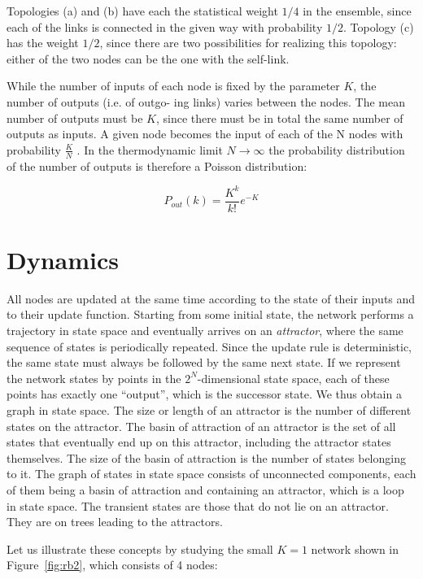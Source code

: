 Topologies (a) and (b) have each the statistical weight $1/4$ in
the ensemble, since each of the links is connected in the
given way with probability $1/2$. Topology (c) has the
weight $1/2$, since there are two possibilities for realizing
this topology: either of the two nodes can be the one
with the self-link.


While the number of inputs of each node is fixed by
the parameter $K$, the number of outputs (i.e. of outgo-
ing links) varies between the nodes. The mean number of
outputs must be $K$, since there must be in total the same
number of outputs as inputs. A given node becomes the
input of each of the N nodes with probability $\frac{K}{N}$ . In
the thermodynamic limit $N \to \infty$ the probability distribution of the number of outputs is therefore a Poisson
distribution:

$$
P_{out}(k) = \frac{K^k}{k!}e^{-K}
$$

\section{Dynamics}

All nodes are updated at the same time
according to the state of their inputs and to their update
function. Starting from some initial state, the network
performs a trajectory in state space and eventually arrives on an \emph{attractor}, where the same sequence of states
is periodically repeated. Since the update rule is deterministic, the same state must always be followed by the
same next state. If we represent the network states by
points in the $2^N$-dimensional state space, each of these
points has exactly one “output”, which is the successor
state. We thus obtain a graph in state space.
The size or length of an attractor is the number of
different states on the attractor. The basin of attraction
of an attractor is the set of all states that eventually
end up on this attractor, including the attractor states
themselves. The size of the basin of attraction is the
number of states belonging to it. The graph of states
in state space consists of unconnected components, each
of them being a basin of attraction and containing an
attractor, which is a loop in state space. The transient
states are those that do not lie on an attractor. They are
on trees leading to the attractors.


Let us illustrate these concepts by studying the small
$K = 1$ network shown in Figure~\ref{fig:rb2}, which consists of 4
nodes:

